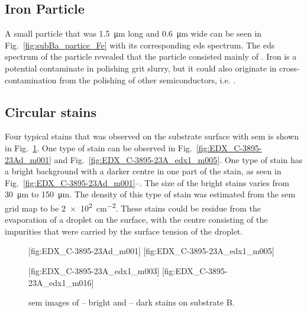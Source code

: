 \subsection{Iron Particle}
A small particle that was \SI{1.5}{\micro\metre} long and \SI{0.6}{\micro\metre} wide can be seen in Fig.~\ref{fig:subBa_partice_Fe} with its corresponding \ac{eds} spectrum. The \ac{eds} spectrum of the particle revealed that the particle consisted mainly of . Iron is a potential contaminate in polishing grit slurry, but it could also originate in cross-contamination from the polishing of other semiconductors, i.e.  \citep{benson2015as-received}.

\subsection{Circular stains}
Four typical stains that was observed on the substrate surface with \ac{sem} is shown in Fig.~\ref{fig:subB_stains}. One type of stain can be observed in Fig.~\ref{fig:EDX_C-3895-23Ad_m001} and Fig.~\ref{fig:EDX_C-3895-23A_edx1_m005}. One type of stain has a bright background with a darker centre in one part of the stain, as seen in Fig.~\ref{fig:EDX_C-3895-23Ad_m001}--. The size of the bright stains varies from \SI{30}{\micro\metre} to \SI{150}{\micro\metre}. The density of this type of stain was estimated from the \ac{sem} grid map to be \SI{2e2}{\centi\metre^{-2}}. These stains could be residue from the evaporation of a droplet on the surface, with the centre consisting of the impurities that were carried by the surface tension of the droplet. %

\begin{figure}[htbp]
    \centering
    [fig:EDX_C-3895-23Ad_m001]
    [fig:EDX_C-3895-23A_edx1_m005]
    \par\bigskip
    [fig:EDX_C-3895-23A_edx1_m003]
    [fig:EDX_C-3895-23A_edx1_m016]
    \caption[\Ac{sem} images of stains on substrate B.]{\Ac{sem} images of -- bright and -- dark stains on substrate B.}
    \label{fig:subB_stains}
\end{figure}

